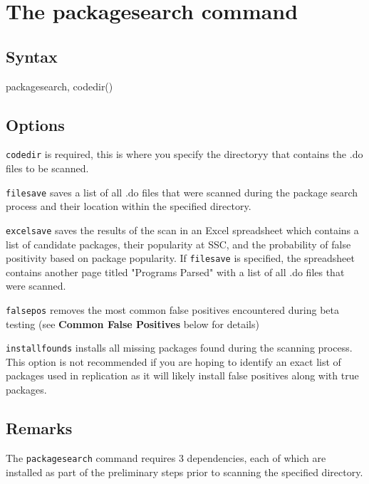 
\section{The packagesearch command}

\subsection{Syntax}

\begin{stsyntax}
packagesearch, 
    codedir(\ststring)
\end{stsyntax}


\subsection{Options}

\texttt{codedir} is required, this is where you specify the directoryy that contains the .do files to be scanned.

\texttt{filesave} saves a list of all .do files that were scanned during the package search process and their location within the specified directory.

\texttt{excelsave} saves the results of the scan in an Excel spreadsheet which contains a list of candidate packages, their popularity at SSC, and the probability of false positivity based on package popularity. If \texttt{filesave} is specified, the spreadsheet contains another page titled "Programs Parsed" with a list of all .do files that were scanned.

\texttt{falsepos} removes the most common false positives encountered during beta testing (see \textbf{Common False Positives} below for details)

\texttt{installfounds} installs all missing packages found during the scanning process. This option is not recommended if you are hoping to identify an exact list of packages used in replication as it will likely install false positives along with true packages.


\subsection{Remarks}

The \texttt{packagesearch} command requires 3 dependencies, each of which are installed as part of the preliminary steps prior to scanning the specified directory. 

